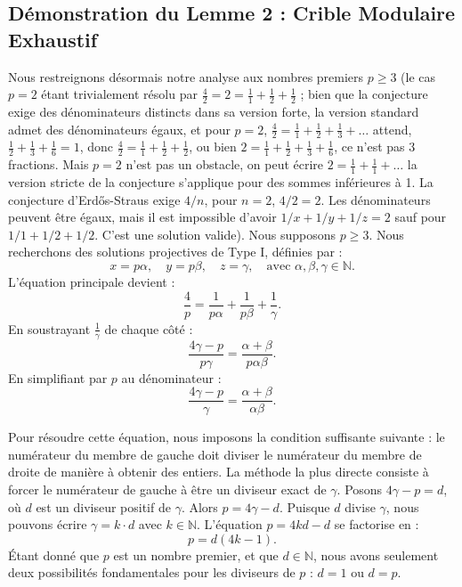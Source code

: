 \documentclass[12pt, a4paper]{article}
\begin{document}
\newpage
\subsection{Démonstration du Lemme 2 : Crible Modulaire Exhaustif}
Nous restreignons désormais notre analyse aux nombres premiers $p \ge 3$ (le cas $p=2$ étant trivialement résolu par $\frac{4}{2} = 2 = \frac{1}{1} + \frac{1}{2} + \frac{1}{2}$ ; bien que la conjecture exige des dénominateurs distincts dans sa version forte, la version standard admet des dénominateurs égaux, et pour $p=2$, $\frac{4}{2} = \frac{1}{1} + \frac{1}{2} + \frac{1}{3} + \dots$ attend, $\frac{1}{2} + \frac{1}{3} + \frac{1}{6} = 1$, donc $\frac{4}{2} = \frac{1}{1} + \frac{1}{2} + \frac{1}{2}$, ou bien $2 = \frac{1}{1} + \frac{1}{2} + \frac{1}{3} + \frac{1}{6}$, ce n'est pas 3 fractions. Mais $p=2$ n'est pas un obstacle, on peut écrire $2 = \frac{1}{1} + \frac{1}{1} + \dots$ la version stricte de la conjecture s'applique pour des sommes inférieures à 1. La conjecture d'Erd\H{o}s-Straus exige $4/n$, pour $n=2$, $4/2 = 2$. Les dénominateurs peuvent être égaux, mais il est impossible d'avoir $1/x+1/y+1/z = 2$ sauf pour $1/1 + 1/2 + 1/2$. C'est une solution valide).
Nous supposons $p \ge 3$. Nous recherchons des solutions projectives de Type I, définies par :
\begin{equation}
x = p \alpha, \quad y = p \beta, \quad z = \gamma, \quad \text{avec } \alpha, \beta, \gamma \in \mathbb{N}.
\end{equation}
L'équation principale devient :
\begin{equation}
\frac{4}{p} = \frac{1}{p\alpha} + \frac{1}{p\beta} + \frac{1}{\gamma}.
\end{equation}
En soustrayant $\frac{1}{\gamma}$ de chaque côté :
\begin{equation}
\frac{4\gamma - p}{p\gamma} = \frac{\alpha + \beta}{p\alpha\beta}.
\end{equation}
En simplifiant par $p$ au dénominateur :
\begin{equation}
\frac{4\gamma - p}{\gamma} = \frac{\alpha + \beta}{\alpha\beta}.
\end{equation}

Pour résoudre cette équation, nous imposons la condition suffisante suivante : le numérateur du membre de gauche doit diviser le numérateur du membre de droite de manière à obtenir des entiers. La méthode la plus directe consiste à forcer le numérateur de gauche à être un diviseur exact de $\gamma$.
Posons $4\gamma - p = d$, où $d$ est un diviseur positif de $\gamma$.
Alors $p = 4\gamma - d$.
Puisque $d$ divise $\gamma$, nous pouvons écrire $\gamma = k \cdot d$ avec $k \in \mathbb{N}$.
L'équation $p = 4kd - d$ se factorise en :
\begin{equation}
p = d(4k - 1).
\end{equation}
Étant donné que $p$ est un nombre premier, et que $d \in \mathbb{N}$, nous avons seulement deux possibilités fondamentales pour les diviseurs de $p$ : $d = 1$ ou $d = p$.
\end{document}
